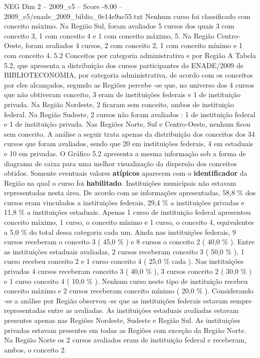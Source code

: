 \begin{textsample}{NEG Dim 2 – 2009\_c5 – Score -8.00 – 2009\_c5/enade\_2009\_biblio\_0e14e9ac55.txt}
Nenhum curso foi classificado com conceito máximo.
Na Região Sul, foram avaliados 5 cursos dos quais 3 com conceito 3, 1 com conceito 4 e 1 com conceito máximo, 5.
Na Região Centro-Oeste, foram avaliados 4 cursos, 2 com conceito 2, 1 com conceito mínimo e 1 com conceito 4. 5.2 Conceitos por categoria administrativa e por Região A Tabela 5.2, que apresenta a distribuição dos cursos participantes do ENADE/2009 de BIBLIOTECONOMIA, por categoria administrativa, de acordo com os conceitos por eles alcançados, segundo as Regiões percebe -se que, no universo dos 4 cursos que não obtiveram conceito, 3 eram de instituições federais e 1 de instituição privada.
Na Região Nordeste, 2 ficaram sem conceito, ambos de instituição federal.
Na Região Sudeste, 2 cursos não foram avaliados : 1 de instituição federal e 1 de instituição privada.
Nas Regiões Norte, Sul e Centro-Oeste, nenhum ficou sem conceito.
A análise a seguir trata apenas da distribuição dos conceitos dos 34 cursos que foram avaliados, sendo que 20 em instituições federais, 4 em estaduais e 10 em privadas.
O Gráfico 5.2 apresenta a mesma informação sob a forma de diagrama de caixa para uma melhor visualização da dispersão dos conceitos obtidos.
Somente eventuais valores \textbf{atípicos} aparecem com o \textbf{identificador} da Região na qual o curso foi \textbf{habilitado}.
Instituições municipais não estavam representadas nesta área.
De acordo com as informações apresentadas, 58,8 \% dos cursos eram vinculados a instituições federais, 29,4 \% a instituições privadas e 11,8 \% a instituições estaduais.
Apenas 1 curso de instituição federal apresentou conceito máximo, 1 curso, o conceito mínimo e 1 curso, o conceito 4, equivalentes a 5,0 \% do total dessa categoria cada um.
Ainda nas instituições federais, 9 cursos receberam o conceito 3 ( 45,0 \% ) e 8 cursos o conceito 2 ( 40,0 \% ).
Entre as instituições estaduais avaliadas, 2 cursos receberam conceito 3 ( 50,0 \% ), 1 curso recebeu conceito 2 e 1 curso conceito 4 ( 25,0 \% cada ).
Nas instituições privadas 4 cursos receberam conceito 3 ( 40,0 \% ), 3 cursos conceito 2 ( 30,0 \% ) e 1 curso conceito 4 ( 10,0 \% ).
Nenhum curso neste tipo de instituição recebeu conceito máximo e 2 cursos receberam conceito mínimo ( 20,0 \% ).
Considerando -se a análise por Região observou -se que as instituições federais estavam sempre representadas entre as avaliadas.
As instituições estaduais avaliadas estavam presentes apenas nas Regiões Nordeste, Sudeste e Região Sul.
As instituições privadas estavam presentes em todas as Regiões com exceção da Região Norte.
Na Região Norte os 2 cursos avaliados eram de instituição federal e receberam, ambos, o conceito 2.

\end{textsample}
